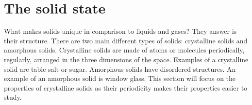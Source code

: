\documentclass[main.tex]{subfiles}
\begin{document}
\section{The solid state}
What makes solids unique in comparison to liquids and gases? They answer is their structure. There are two main different types of solids: crystalline solids and amorphous solids. Crystalline solids are made of atoms or molecules periodically, regularly, arranged in the three dimensions of the space. Examples of a crystalline solid are table salt or sugar. Amorphous solids have disordered structures. An example of an amorphous solid is window glass. This section will focus on the properties of crystalline solids as their periodicity makes their properties easier to study.
\sloppy 
\end{document}

